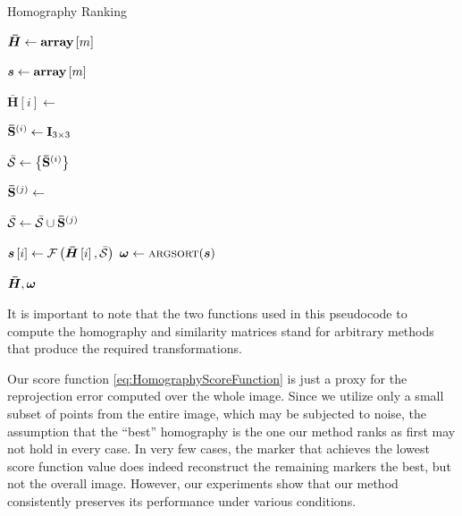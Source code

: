 \def\hmatrices{\boldsymbol{\bar{H}}}
\def\scoref{\mathcal{F}}

\begin{algorithm}[t]
    \caption{Homography Ranking}
    \label{alg:HomographyRanking}
    \begin{algorithmic}[1]
        \State $\hmatrices \gets \arraydef \left[ m \right]$

        \State $\boldsymbol{s} \gets {\text{\textbf{array}}} \left[ m \right]$


        \State $\hmatrices \left[ i \right] \gets$

        \State ${\mathbf{\bar{S}}}^{\left( {i} \right)} \gets \mathbf{I}_{3 \times 3}$

        \State $\mathcal{\bar{S}} \gets \left\{ {{\mathbf{\bar{S}}}^{\left( {i} \right)}} \right\}$


        \State ${\mathbf{\bar{S}}}^{\left( {j} \right)} \gets$ \Call{similarity}{$\hmatrices \left[ i \right] \cdot \suprbrackets{\mtx{W}}{j}$, $\mtx{T }$}

        \State$\mathcal{\bar{S}} \gets \mathcal{\bar{S}} \cup {\mathbf{\bar{S}}}^{\left( {j} \right)}$
        \EndFor

        \State $\scores \left[ i \right] \gets \func{\scoref}{\hmatrices \left[ i \right], \mset{\bar{S}}}$
        \EndFor
        \State $\sortres \gets \Call{argsort}{\scores}$

        \State \Return $\hmatrices, \sortres$
    \end{algorithmic}
\end{algorithm}

It is important to note that the two functions used in this pseudocode to compute the homography and similarity matrices stand for arbitrary methods that produce the required transformations.

Our score function \eqref{eq:HomographyScoreFunction} is just a proxy for the reprojection error computed over the whole image. Since we utilize only a small subset of points from the entire image, which may be subjected to noise, the assumption that the ``best'' homography is the one our method ranks as first may not hold in every case. In very few cases, the marker that achieves the lowest score function value does indeed reconstruct the remaining markers the best, but not the overall image. However, our experiments show that our method consistently preserves its performance under various conditions.
